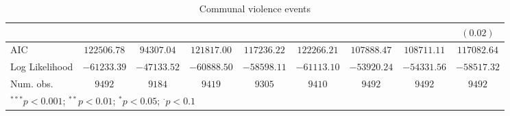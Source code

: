 \begin{sidewaystable}
\begin{center}
{\begin{tabular}{l c c c c c c c c}
                               &               &               &               &                 &               &               &                & $(0.02)$      \\
\midrule
AIC                            & $122506.78$   & $94307.04$    & $121817.00$   & $117236.22$     & $122266.21$   & $107888.47$   & $108711.11$    & $117082.64$   \\
Log Likelihood                 & $-61233.39$   & $-47133.52$   & $-60888.50$   & $-58598.11$     & $-61113.10$   & $-53920.24$   & $-54331.56$    & $-58517.32$   \\
Num. obs.                      & $9492$        & $9184$        & $9419$        & $9305$          & $9410$        & $9492$        & $9492$         & $9492$        \\
\bottomrule
\multicolumn{9}{l}{\scriptsize{$^{***}p<0.001$; $^{**}p<0.01$; $^{*}p<0.05$; $^{\cdot}p<0.1$}}
\end{tabular}
}
\caption{Communal violence events}
\label{znon_state}
\end{center}
\end{sidewaystable}
